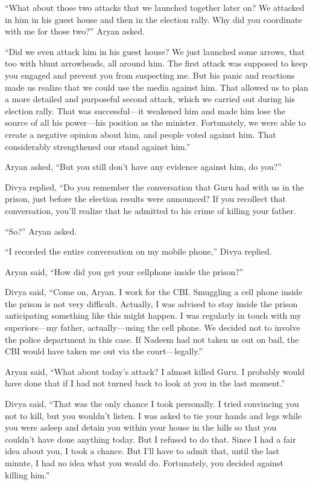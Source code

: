 “What about those two attacks that we launched together later on? We attacked in
him in his guest house and then in the election rally. Why did you coordinate
with me for those two?” Aryan asked.

“Did we even attack him in his guest house? We just launched some arrows, that
too with blunt arrowheads, all around him. The first attack was supposed to keep
you engaged and prevent you from suspecting me. But his panic and reactions made
us realize that we could use the media against him. That allowed us to plan a
more detailed and purposeful second attack, which we carried out during his
election rally. That was successful—it weakened him and made him lose the
source of all his power—his position as the minister. Fortunately, we were
able to create a negative opinion about him, and people voted against him. That
considerably strengthened our stand against him.”

Aryan asked, “But you still don't have any evidence against him, do you?”

Divya replied, “Do you remember the conversation that Guru had with us in the
prison, just before the election results were announced? If you recollect that
conversation, you'll realize that he admitted to his crime of killing your
father.

“So?” Aryan asked.

“I recorded the entire conversation on my mobile phone,” Divya replied.

Aryan said, “How did you get your cellphone inside the prison?”

Divya said, “Come on, Aryan. I work for the CBI. Smuggling a cell phone inside the
prison is not very difficult. Actually, I was advised to stay inside the prison
anticipating something like this might happen. I was regularly in touch with my
superiors—my father, actually—using the cell phone. We decided not to involve
the police department in this case. If Nadeem had not taken us out on bail, the
CBI would have taken me out via the court—legally.”

Aryan said, “What about today's attack? I almost killed Guru. I probably would
have done that if I had not turned back to look at you in the last moment.”

Divya said, “That was the only chance I took personally. I tried convincing you
not to kill, but you wouldn't listen. I was asked to tie your hands and legs
while you were asleep and detain you within your house in the hills so that you
couldn't have done anything today. But I refused to do that. Since I had a fair
idea about you, I took a chance. But I'll have to admit that, until the last
minute, I had no idea what you would do. Fortunately, you decided against
killing him.”

